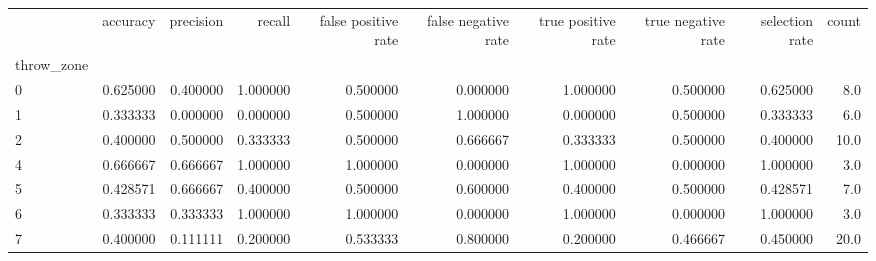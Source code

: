 \begin{tabular}{lrrrrrrrrr}
\toprule
{} &  accuracy &  precision &    recall &  false positive rate &  false negative rate &  true positive rate &  true negative rate &  selection rate &  count \\
throw\_zone &           &            &           &                      &                      &                     &                     &                 &        \\
\midrule
0          &  0.625000 &   0.400000 &  1.000000 &             0.500000 &             0.000000 &            1.000000 &            0.500000 &        0.625000 &    8.0 \\
1          &  0.333333 &   0.000000 &  0.000000 &             0.500000 &             1.000000 &            0.000000 &            0.500000 &        0.333333 &    6.0 \\
2          &  0.400000 &   0.500000 &  0.333333 &             0.500000 &             0.666667 &            0.333333 &            0.500000 &        0.400000 &   10.0 \\
4          &  0.666667 &   0.666667 &  1.000000 &             1.000000 &             0.000000 &            1.000000 &            0.000000 &        1.000000 &    3.0 \\
5          &  0.428571 &   0.666667 &  0.400000 &             0.500000 &             0.600000 &            0.400000 &            0.500000 &        0.428571 &    7.0 \\
6          &  0.333333 &   0.333333 &  1.000000 &             1.000000 &             0.000000 &            1.000000 &            0.000000 &        1.000000 &    3.0 \\
7          &  0.400000 &   0.111111 &  0.200000 &             0.533333 &             0.800000 &            0.200000 &            0.466667 &        0.450000 &   20.0 \\
\bottomrule
\end{tabular}
